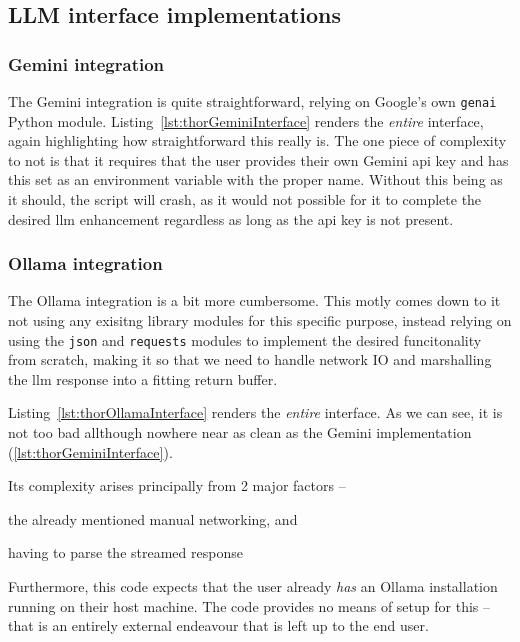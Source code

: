 \subsection*{LLM interface implementations}
\subsubsection{Gemini integration}

The Gemini integration is quite straightforward, relying on Google's own
\texttt{genai} Python module. Listing~\ref{lst:thorGeminiInterface} renders the
\emph{entire} interface, again highlighting how straightforward this really is.
The one piece of complexity to not is that it requires that the user provides
their own Gemini \acrshort{api} key and has this set as an environment variable
with the proper name. Without this being as it should, the script will crash, as
it would not possible for it to complete the desired \acrshort{llm} enhancement
regardless as long as the \acrshort{api} key is not present.



\subsubsection{Ollama integration}

The Ollama integration is a bit more cumbersome. This motly comes down to it not
using any exisitng library modules for this specific purpose, instead relying on
using the \texttt{json} and \texttt{requests} modules to implement the desired
funcitonality from scratch, making it so that we need to handle network IO and
marshalling the \acrfull{llm} response into a fitting return buffer.

Listing~\ref{lst:thorOllamaInterface} renders the
\emph{entire} interface. As we can see, it is not too bad allthough nowhere near
as clean as the Gemini implementation (\ref{lst:thorGeminiInterface}).

Its complexity arises principally from \num{2} major factors --
\begin{inparaenum}
    \item the already mentioned manual networking, and
    \item having to parse the streamed response
\end{inparaenum}
Furthermore, this code expects that the user already \emph{has} an Ollama
installation running on their host machine. The code provides no means of setup
for this -- that is an entirely external endeavour that is left up to the end user.

